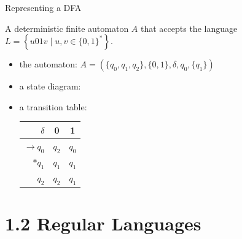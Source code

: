 \documentclass[handout]{beamer}
\begin{document}
\begin{frame}{Representing a DFA}

    \begin{example}
    A deterministic finite automaton $A$ that \alert{accepts} the language
    $L=\left\{  u01v\mid u,v\in\{0,1\}^* \right\}$.
    \end{example}

    \begin{itemize}
        \item the automaton: $A=(\{q_0,q_1,q_2\},\{0,1\},\delta,q_0,\{q_1\})$
        \item a \alert{state diagram}:        
        \begin{center}
        \end{center}            
        \item a \alert{transition table}:        
        \begin{center}
            \begin{tabular}{r||c|c} 
                $\delta$ & 0 & 1\\ \hline \hline		
                $\rightarrow q_0$ & $q_2$ & $q_0$\\ \hline 
                $*q_1$ & $q_1$ & $q_1$\\ \hline 
                $q_2$ & $q_2$ & $q_1$
            \end{tabular}
        \end{center}
    \end{itemize}
    
\end{frame}


\section{1.2 Regular Languages}
\end{document}
